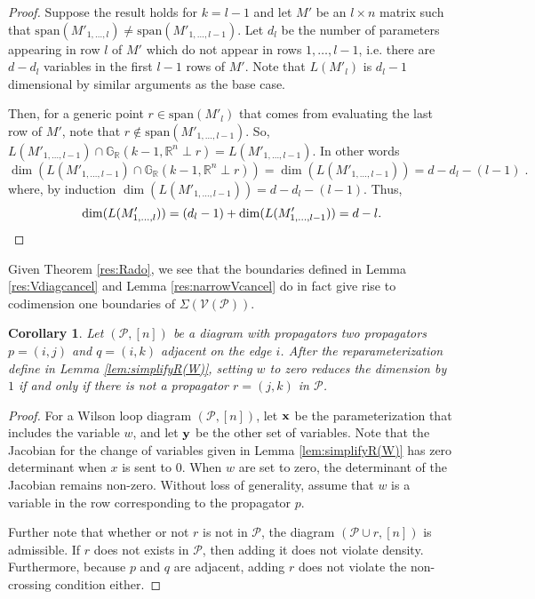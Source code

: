\documentclass[11pt]{article}
\newcommand{\R}{\mathbb{R}}
\newcommand{\Grall}{\mathbb{G}_{\R}}
\newcommand{\cP}{\mathcal{P}}
\newcommand{\cV}{\mathcal{V}}
\newcommand{\VP}{\cV(\cP)}
\newtheorem{cor}[thm]{Corollary}
\theoremstyle{remark}
\theoremstyle{definition}
\begin{document}
\begin{appendices}
\begin{proof}
Suppose the result holds for $k = l-1$ and let $M'$ be an $l \times n$ matrix such that $\mathrm{span}(M'_{1,\dots,l}) \neq \mathrm{span}(M'_{1,\dots,l-1})$. Let $d_l$ be the number of parameters appearing in row $l$ of $M'$ which do not appear in rows $1, \dots, l-1$, i.e. there are $d - d_l$ variables in the first $l-1$ rows of $M'$. Note that $L(M'_l)$ is $d_l -1$ dimensional by similar arguments as the base case.

Then, for a generic point $r \in \mathrm{span}(M'_{l})$ that comes from evaluating the last row of $M'$, note that $r \notin \mathrm{span}(M'_{1,\dots,l-1})$. So, $L(M'_{1,\dots,l-1})\cap \Grall(k-1, \mathbb{R}^n \perp r) = L(M'_{1,\dots,l-1})$. In other words
%
\begin{displaymath}
\dim(L(M'_{1,\dots,l-1}) \cap \Grall(k-1, \mathbb{R}^n \perp r)) = \dim(L(M'_{1,\dots,l-1})) = d - d_l -(l-1)\;.
\end{displaymath}
%
\noindent
where, by induction $\dim(L(M'_{1,\dots,l-1})) = d - d_l -(l-1)$. Thus,
%
\begin{displaymath}
\dim(L(M'_{1,\dots,l})) = (d_l - 1) + \dim(L(M'_{1,\dots,l-1})) = d-l.
\qedhere
\end{displaymath}
\end{proof}

Given Theorem \ref{res:Rado}, we see that the boundaries defined in Lemma \ref{res:Vdiagcancel} and Lemma \ref{res:narrowVcancel} do in fact give rise to codimension one boundaries of $\Sigma(\VP)$.

\begin{cor} \label{res:reparamdim}
Let $(\cP, [n])$ be a diagram with propagators two propagators $p = (i, j)$ and $q = (i, k)$ adjacent on the edge $i$. After the reparameterization define in Lemma \ref{lem:simplifyR(W)}, setting $w$ to zero reduces the dimension by $1$ if and only if there is not a propagator $r = (j, k)$ in $\cP$.
\end{cor}
\begin{proof}
For a Wilson loop diagram $(\cP, [n])$, let $\bf{x}$ be the parameterization that includes the variable $w$, and let $\bf{y}$ be the other set of variables. Note that the Jacobian for the change of variables given in Lemma \ref{lem:simplifyR(W)} has zero determinant when $x$ is sent to $0$. When $w$ are set to zero, the determinant of the Jacobian remains non-zero. Without loss of generality, assume that $w$ is a variable in the row corresponding to the propagator $p$.

Further note that whether or not $r$ is not in $\cP$, the diagram $(\cP \cup r, [n])$ is admissible. If $r$ does not exists in $\cP$, then adding it does not violate density. Furthermore, because $p$ and $q$ are adjacent, adding $r$ does not violate the non-crossing condition either. 


\end{proof}
\end{appendices}
\end{document}
